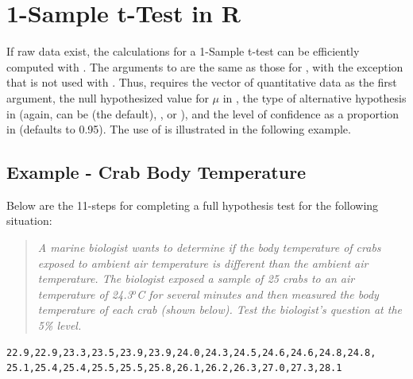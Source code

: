 \documentclass[10pt,openany]{book}\usepackage[]{graphicx}\usepackage[]{color}
\begin{document}
\section{1-Sample t-Test in R}
\vspace*{-3pt}
If raw data exist, the calculations for a 1-Sample t-test can be efficiently computed with . The arguments to  are the same as those for , with the exception that  is not used with . Thus,  requires the vector of quantitative data as the first argument, the null hypothesized value for $\mu$ in , the type of alternative hypothesis in  (again, can be  (the default), , or ), and the level of confidence as a proportion in  (defaults to 0.95). The use of  is illustrated in the following example.

\subsection{Example - Crab Body Temperature}
\vspace*{-6pt}
Below are the 11-steps  for completing a full hypothesis test for the following situation:

\vspace*{-12pt}
\begin{quote}
\textsl{A marine biologist wants to determine if the body temperature of crabs exposed to ambient air temperature is different than the ambient air temperature. The biologist exposed a sample of 25 crabs to an air temperature of 24.3$^{o}$C for several minutes and then measured the body temperature of each crab (shown below). Test the biologist's question at the 5\% level.}
\end{quote}

\vspace*{-18pt}
\begin{Verbatim}[xleftmargin=15mm]
22.9,22.9,23.3,23.5,23.9,23.9,24.0,24.3,24.5,24.6,24.6,24.8,24.8,
25.1,25.4,25.4,25.5,25.5,25.8,26.1,26.2,26.3,27.0,27.3,28.1
\end{Verbatim}
\vspace*{-18pt}
\end{document}
